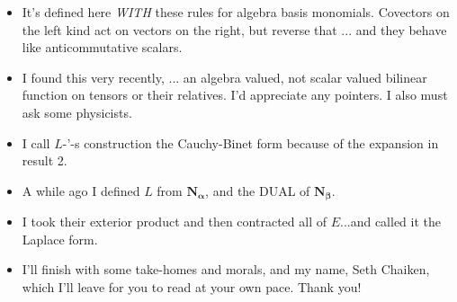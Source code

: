 \documentclass[14pt]{extarticle}
\begin{document}
{\begin{itemize}
\item
  It's defined here \emph{WITH} these rules for algebra basis monomials.  Covectors
  on the left kind act on vectors on the right, but reverse that ... and
  they behave like anticommutative scalars.


\item
  I found this very recently, ... an algebra valued, not scalar valued bilinear
  function on tensors or their relatives.  I'd appreciate any pointers.
  I also must ask some physicists.

\item
I call $L$-'-s construction the Cauchy-Binet form because of the expansion in result 2.

\item
A while ago I defined $L$ from $\mathbf{N_\alpha}$, and the DUAL of $\mathbf{N_\beta}$.

\item
I took their exterior product and then contracted all of $E$...and called it the
Laplace form.

\item
  I'll finish with some take-homes and morals, and my name, Seth Chaiken, which
  I'll leave for you to read at your own pace.  Thank you!
  \end{itemize}
}
\end{document}
